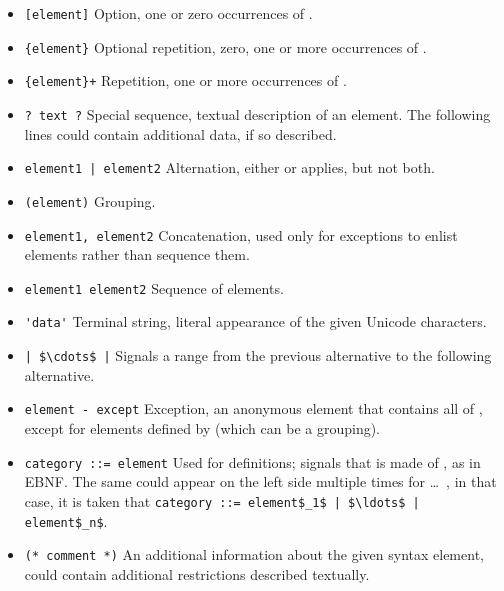 \begin{itemize}
  \item \lstinline![element]! \newline
    Option, one or zero occurrences of . 
  \item \lstinline!{element}! \newline
    Optional repetition, zero, one or more occurrences of .
  \item \lstinline!{element}+! \newline
    Repetition, one or more occurrences of .
  \item \lstinline!? text ?! \newline
    Special sequence, textual description of an element. The following lines could contain additional data, if so described.
  \item \lstinline!element1 | element2! \newline
    Alternation, either  or  applies, but not both. 
  \item \lstinline!(element)! \newline
    Grouping. 
  \item \lstinline!element1, element2! \newline
    Concatenation, used only for exceptions to enlist elements rather than sequence them. 
  \item \lstinline!element1 element2! \newline
    Sequence of elements.
  \item \lstinline!'data'! \newline
    Terminal string, literal appearance of the given Unicode characters. 
  \item \lstinline!| $\cdots$ |! \newline
    Signals a range from the previous alternative to the following alternative. 
  \item \lstinline!element - except! \newline
    Exception, an anonymous element that contains all of , except for elements defined by  (which can be a grouping). 
  \item \lstinline!category ::= element! \newline
    Used for definitions; signals that  is made of , as in EBNF. The same  could appear on the left side multiple times for  \ldots\ , in that case, it is taken that \lstinline!category ::= element$_1$ | $\ldots$ | element$_n$!.
  \item \lstinline!(* comment *)! \newline
    An additional information about the given syntax element, could contain additional restrictions described textually. 
\end{itemize}







